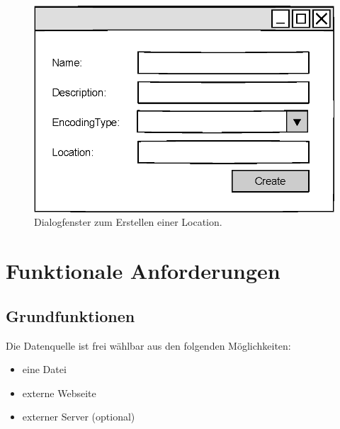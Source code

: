 \documentclass[a4paper, 12 pt]{article}
\begin{document}
\begin{figure}[htbp]
\centering
\includegraphics[scale=1]{images/loc}
\caption{\label{fig:loc}Dialogfenster zum Erstellen einer Location.}
\end{figure}

\newpage
\section{Funktionale Anforderungen}
\subsection{Grundfunktionen}
	
	Die Datenquelle ist frei wählbar aus den folgenden Möglichkeiten:
		\begin{itemize}
			\item eine Datei
			\item externe Webseite
			\item externer Server (optional)
		\end{itemize}
		
	
\end{document}
